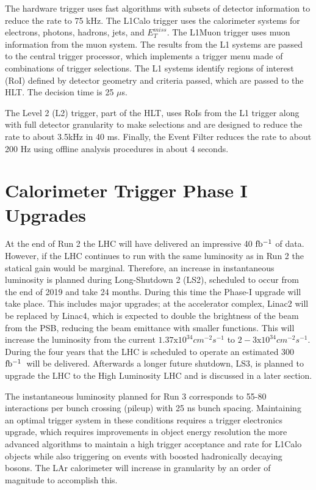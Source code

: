 The hardware trigger uses fast algorithms with subsets of detector information to reduce the rate to 75 kHz.  The L1Calo trigger uses the calorimeter systems for electrons, photons, hadrons, jets, and $E_{T}^{miss}$.  The L1Muon trigger uses muon information from the muon system.  The results from the L1 systems are passed to the central trigger processor, which implements a trigger menu made of combinations of trigger selections.    The L1 systems identify regions of interest (RoI) defined by detector geometry and criteria passed, which are passed to the HLT.  The decision time is 25 $\mu$s.

The Level 2 (L2) trigger, part of the HLT, uses RoIs from the L1 trigger along with full detector granularity to make selections and are designed to reduce the rate to about 3.5kHz in 40 ms.  Finally, the Event Filter reduces the rate to about 200 Hz using offline analysis procedures in about 4 seconds.  

\section{Calorimeter Trigger Phase I Upgrades}
At the end of Run 2 the LHC will have delivered an impressive 40 $\mbox{fb$^{-1}$}$ of data.  However, if the LHC continues to run with the same luminosity as in Run 2 the statical gain would be marginal.  Therefore, an increase in instantaneous luminosity is planned during Long-Shutdown 2 (LS2), scheduled to occur from the end of 2019 and take 24 months.  During this time the Phase-I upgrade will take place.  This includes major upgrades; at the accelerator complex, Linac2 will be replaced by Linac4, which is expected to double the brightness of the beam from the PSB, reducing the beam emittance with smaller \beta functions.  This will increase the luminosity from the current $1.37\mathrm{x}10^{34}cm^{-2}s^{-1}$ to $2-3\mathrm{x}10^{34}cm^{-2}s^{-1}$.  During the four years that the LHC is scheduled to operate an estimated 300 $\mbox{fb$^{-1}$}$\ will be delivered. Afterwards a longer future shutdown, LS3, is planned to upgrade the LHC to the High Luminosity LHC and is discussed in a later section.

The instantaneous luminosity planned for Run 3 corresponds to 55-80 interactions per bunch crossing (pileup) with 25 ns bunch spacing.  Maintaining an optimal trigger system in these conditions requires a trigger electronics upgrade, which requires improvements in object energy resolution the more advanced algorithms to maintain a high trigger acceptance and rate for L1Calo objects while also triggering on events with boosted hadronically decaying bosons.  The LAr calorimeter will increase in granularity by an order of magnitude to accomplish this. 

